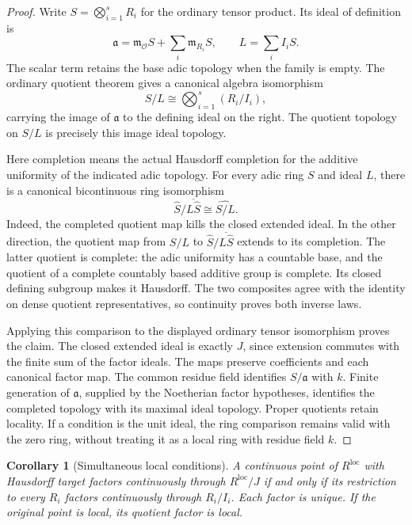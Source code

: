 \documentclass[11pt]{amsart}
\newtheorem{corollary}[corollary]{Corollary}
\theoremstyle{definition}
\theoremstyle{remark}
\newcommand{\OO}{\mathcal O}
\newcommand{\frakm}{\mathfrak m}
\newcommand{\fraka}{\mathfrak a}
\begin{document}
\begin{proof}
Write \(S=\bigotimes_{i=1}^{s}R_i\) for the ordinary tensor product. Its ideal of definition is
\[
\fraka=\frakm_{\OO}S+\sum_i\frakm_{R_i}S,
\qquad L=\sum_i I_iS.
\]
The scalar term retains the base adic topology when the family is empty. The ordinary quotient theorem gives a canonical algebra isomorphism
\[
S/L\cong\bigotimes_{i=1}^{s}(R_i/I_i),
\]
carrying the image of \(\fraka\) to the defining ideal on the right. The quotient topology on \(S/L\) is precisely this image ideal topology.

Here completion means the actual Hausdorff completion for the additive uniformity of the indicated adic topology. For every adic ring \(S\) and ideal \(L\), there is a canonical bicontinuous ring isomorphism
\[
\widehat S\big/\overline{L\widehat S}\cong\widehat{S/L}.
\]
Indeed, the completed quotient map kills the closed extended ideal. In the other direction, the quotient map from \(S/L\) to \(\widehat S/\overline{L\widehat S}\) extends to its completion. The latter quotient is complete: the adic uniformity has a countable base, and the quotient of a complete countably based additive group is complete. Its closed defining subgroup makes it Hausdorff. The two composites agree with the identity on dense quotient representatives, so continuity proves both inverse laws.

Applying this comparison to the displayed ordinary tensor isomorphism proves the claim. The closed extended ideal is exactly \(J\), since extension commutes with the finite sum of the factor ideals. The maps preserve coefficients and each canonical factor map. The common residue field identifies \(S/\fraka\) with \(k\). Finite generation of \(\fraka\), supplied by the Noetherian factor hypotheses, identifies the completed topology with its maximal ideal topology. Proper quotients retain locality. If a condition is the unit ideal, the ring comparison remains valid with the zero ring, without treating it as a local ring with residue field \(k\).
\end{proof}

\begin{corollary}[Simultaneous local conditions]\label{cor:simultaneous_local}
A continuous point of \(R^{\mathrm{loc}}\) with Hausdorff target factors continuously through \(R^{\mathrm{loc}}/J\) if and only if its restriction to every \(R_i\) factors continuously through \(R_i/I_i\). Each factor is unique. If the original point is local, its quotient factor is local.
\end{corollary}
\end{document}
